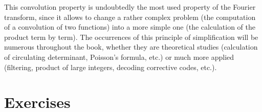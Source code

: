  This convolution property is undoubtedly the
most used property of the Fourier transform, since it allows to change a rather
complex problem (the computation of a convolution of two functions) into a more
simple one (the calculation of the product term by term). The occurrences of this principle of simplification will be numerous throughout the book, whether they are theoretical studies (calculation of circulating determinant, Poisson's formula, etc.) or much more applied (filtering, product of large integers, decoding corrective codes, etc.).
\section{Exercises}
\label{sect1-chap1-exercises}

